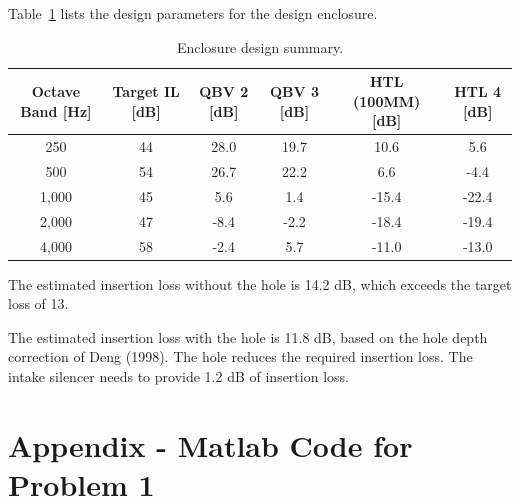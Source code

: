 {{{Table~\ref{table:DesignParametersEnclosure} lists the design parameters for the design enclosure.

\vspace{0.25cm}
\setlength{\abovecaptionskip}{0pt}
\vspace{0.1cm}
{\renewcommand{\arraystretch}{1.25}
\begin{table}[h!]
    \begin{center}
        \small
        \begin{tabular}{ | c | c | c | c | c | c |}
            \hline
            \textbf{Octave Band [Hz]}  &  \textbf{Target IL [dB]}  &  \textbf{QBV 2 [dB]}  &  \textbf{QBV 3 [dB]}  &  \textbf{HTL (100MM) [dB]}  &  \textbf{HTL 4 [dB]}  \\
            \hline
            250    &  44  &  28.0  &  19.7  &  10.6   &  5.6  \\
            \rowcolor{Gray}
            500    &  54  &  26.7  &  22.2  &  6.6    &  -4.4  \\
            1,000  &  45  &  5.6   &  1.4   &  -15.4  &  -22.4  \\
            \rowcolor{Gray}
            2,000  &  47  &  -8.4  &  -2.2  &  -18.4  &  -19.4  \\
            4,000  &  58  &  -2.4  &  5.7   &  -11.0  &  -13.0  \\
            \hline
        \end{tabular}
    \end{center}
    \caption{Enclosure design summary.}
    \label{table:DesignParametersEnclosure}
\end{table}


The estimated insertion loss without the hole is 14.2 dB, which exceeds the target loss of 13.

\vspace{0.25cm}
The estimated insertion loss with the hole is 11.8 dB, based on the hole depth correction of Deng (1998).  The hole reduces the required insertion loss.  The intake silencer needs to provide 1.2 dB of insertion loss.






\newpage
\section{Appendix - Matlab Code for Problem 1}
\label{appendix:problem1}




}}}}
